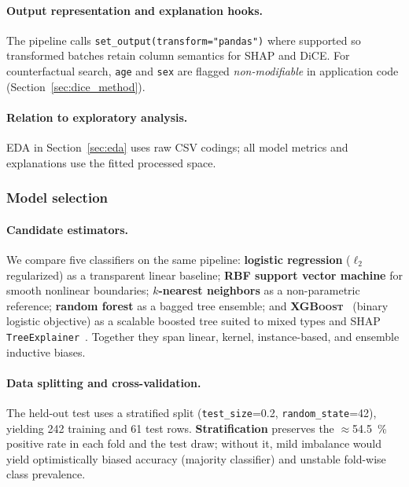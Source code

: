 \documentclass[11pt,a4paper]{article}
\begin{document}
\paragraph{Output representation and explanation hooks.}
The pipeline calls \texttt{set\_output(transform="pandas")} where supported so transformed batches retain column semantics for SHAP and DiCE. For counterfactual search, \texttt{age} and \texttt{sex} are flagged \emph{non-modifiable} in application code (Section~\ref{sec:dice_method}).

\paragraph{Relation to exploratory analysis.}
EDA in Section~\ref{sec:eda} uses raw CSV codings; all model metrics and explanations use the fitted processed space.

\subsubsection{Model selection}
\label{sec:model_selection}

\paragraph{Candidate estimators.}
We compare five classifiers on the same pipeline: \textbf{logistic regression} ($\ell_2$ regularized) as a transparent linear baseline; \textbf{RBF support vector machine} for smooth nonlinear boundaries; \textbf{$k$-nearest neighbors} as a non-parametric reference; \textbf{random forest} as a bagged tree ensemble; and \textbf{\textsc{XGBoost}}~\cite{chen2016xgboost} (binary logistic objective) as a scalable boosted tree suited to mixed types and SHAP \texttt{TreeExplainer}~\cite{lundberg2018tree}. Together they span linear, kernel, instance-based, and ensemble inductive biases.

\paragraph{Data splitting and cross-validation.}
The held-out test uses a stratified split (\texttt{test\_size}=0.2, \texttt{random\_state}=42), yielding \num{242} training and \num{61} test rows. \textbf{Stratification} preserves the $\approx$\SI{54.5}{\percent} positive rate in each fold and the test draw; without it, mild imbalance would yield optimistically biased accuracy (majority classifier) and unstable fold-wise class prevalence.
\end{document}
